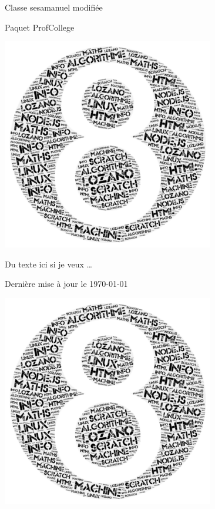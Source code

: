 \pagestyle{backCover}
\parindent=0pt
\mySite{} Classe sesamanuel modifiée

\myManualName{} Paquet ProfCollege
\begin{center}
    \includegraphics[scale=0.5]{images/8.png}%
\end{center}
\hrulefill

Du texte ici si je veux \ldots

\hrulefill
\vspace*{1cm}
\begin{center}\bfseries\Large
    \myAuthorName
\end{center}
\begin{center}\bfseries
    \myAuthorSchoolName

    \currentSchoolYear
\end{center}    
\begin{center}\bfseries\textcolor{red}
    \myMessage
\end{center}
    
\begin{flushright}
       Dernière mise à jour le \today 
\end{flushright}   
\begin{center}
    \includegraphics[scale=0.5]{images/8.png}%
\end{center}
